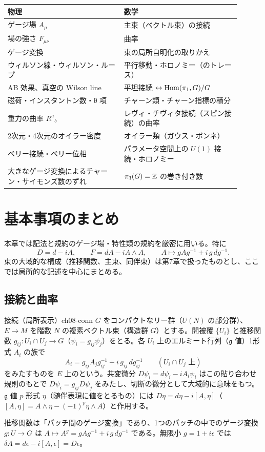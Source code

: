 \begin{physbox}[：本章の辞書]
\begin{center}
\small
\begin{tabular}{p{0.45\linewidth}p{0.45\linewidth}}
物理 & 数学\\ \hline
ゲージ場 $A_\mu$ & 主束（ベクトル束）の接続\\
場の強さ $F_{\mu\nu}$ & 曲率\\
ゲージ変換 & 束の局所自明化の取りかえ\\
ウィルソン線・ウィルソン・ループ & 平行移動・ホロノミー（のトレース）\\
AB 効果、真空の Wilson line & 平坦接続 $\leftrightarrow\operatorname{Hom}(\pi_1,G)/G$\\
磁荷・インスタントン数・θ 項 & チャーン類・チャーン指標の積分\\
重力の曲率 $R^a{}_b$ & レヴィ・チヴィタ接続（スピン接続）の曲率\\
2次元・4次元のオイラー密度 & オイラー類（ガウス・ボンネ）\\
ベリー接続・ベリー位相 & パラメータ空間上の $U(1)$ 接続・ホロノミー\\
大きなゲージ変換によるチャーン・サイモンズ数のずれ & $\pi_3(G)=\mathbb{Z}$ の巻き付き数
\end{tabular}
\end{center}
\end{physbox}

\section{基本事項のまとめ}

本章では記法と規約のゲージ場・特性類の規約を厳密に用いる。特に
\[
D=d-iA,\qquad F=dA-iA\wedge A,\qquad A\mapsto gAg^{-1}+i\,g\,dg^{-1}.
\]
束の大域的な構成（推移関数、主束、同伴束）は第7章で扱ったものとし、ここでは局所的な記述を中心にまとめる。

\subsection{接続と曲率}

\begin{mydef}{接続（局所表示）}{ch08-conn}
$G$ をコンパクトなリー群（$U(N)$ の部分群）、$E\to M$ を階数 $N$ の複素ベクトル束（構造群 $G$）とする。開被覆 $\{U_i\}$ と推移関数 $g_{ij}\colon U_i\cap U_j\to G$（$\psi_i=g_{ij}\psi_j$）をとる。各 $U_i$ 上のエルミート行列（$\mathfrak g$ 値）1形式 $A_i$ の族で
\[
A_i=g_{ij}A_jg_{ij}^{-1}+i\,g_{ij}\,dg_{ij}^{-1}\qquad(U_i\cap U_j\text{ 上})
\]
をみたすものを $E$ 上のという。共変微分 $D\psi_i=d\psi_i-iA_i\psi_i$ はこの貼り合わせ規則のもとで $D\psi_i=g_{ij}D\psi_j$ をみたし、切断の微分として大域的に意味をもつ。$\mathfrak g$ 値 $p$ 形式 $\eta$（随伴表現に値をとるもの）には $D\eta=d\eta-i[A,\eta]$（$[A,\eta]=A\wedge\eta-(-1)^p\eta\wedge A$）と作用する。
\end{mydef}
推移関数は「パッチ間のゲージ変換」であり、1つのパッチの中でのゲージ変換 $g\colon U\to G$ は $A\mapsto A^g=gAg^{-1}+i\,g\,dg^{-1}$ である。無限小 $g=1+i\epsilon$ では $\delta A=d\epsilon-i[A,\epsilon]=D\epsilon$。

